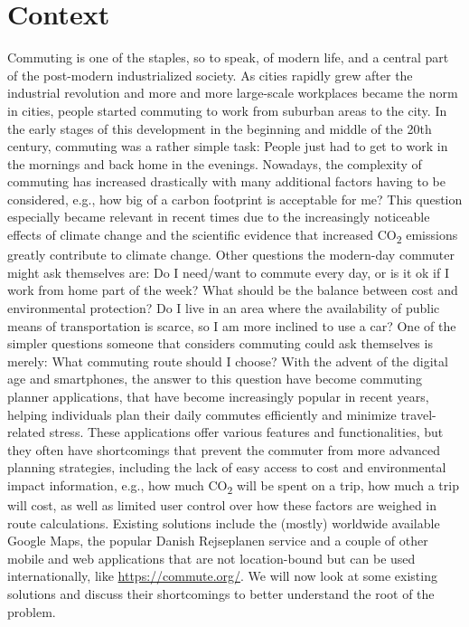\section{Context}\label{sec:context}

Commuting is one of the staples, so to speak, of modern life, and a central part of the post-modern industrialized
society.
As cities rapidly grew after the industrial revolution and more and more large-scale workplaces became the norm in
cities, people started commuting to work from suburban areas to the city.
In the early stages of this development in the beginning and middle of the 20th century, commuting was a rather simple
task: People just had to get to work in the mornings and back home in the evenings.
Nowadays, the complexity of commuting has increased drastically with many additional factors having to be considered,
e.g., how big of a carbon footprint is acceptable for me?
This question especially became relevant in recent times due to the increasingly noticeable effects of climate change
and the scientific evidence that increased \unit{CO_{2}} emissions greatly contribute to climate change.
Other questions the modern-day commuter might ask themselves are: Do I need/want to commute every day, or is it ok if I
work from home part of the week?
What should be the balance between cost and environmental protection?
Do I live in an area where the availability of public means of transportation is scarce, so I am more inclined to use a
car?
One of the simpler questions someone that considers commuting could ask themselves is merely: What commuting route
should I choose?
With the advent of the digital age and smartphones, the answer to this question have become commuting planner
applications, that have become increasingly popular in recent years, helping individuals plan their daily commutes
efficiently and minimize travel-related stress.
These applications offer various features and functionalities, but they often have shortcomings that prevent the
commuter from more advanced planning strategies, including the lack of easy access to cost and environmental impact
information, e.g., how much \unit{CO_{2}} will be spent on a trip, how much a trip will cost, as well as limited user
control over how these factors are weighed in route calculations.
Existing solutions include the (mostly) worldwide available Google Maps, the popular Danish Rejseplanen service and a
couple of other mobile and web applications that are not location-bound but can be used internationally, like
\url{https://commute.org/}.
We will now look at some existing solutions and discuss their shortcomings to better understand the root of the problem.


